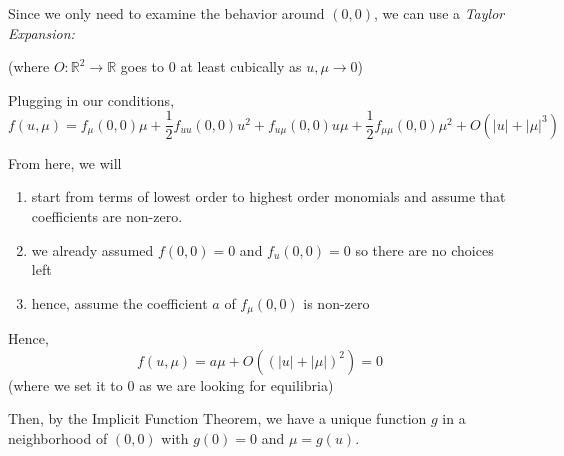 \documentclass[12pt]{report}
\newcommand{\R}{\mathbb{R}}
\newcommand{\abs}[1]{\left\vert #1 \right\vert}
\begin{document}
Since we only need to examine the behavior around $(0, 0)$, we can use a \emph{Taylor Expansion:}

(where $O: \R^2 \to \R$ goes to $0$ at least cubically as $u, \mu \to 0$)

Plugging in our conditions,
\[f(u, \mu) = f_{\mu}(0, 0) \mu + \frac{1}{2}f_{uu}(0,0)u^2 + f_{u\mu}(0, 0)u\mu + \frac{1}{2}f_{\mu\mu}(0, 0)\mu^2 + O({\abs{u}+ \abs{\mu}}^3)\]

From here, we will
\begin{enumerate}
    \item start from terms of lowest order to highest order monomials and assume that coefficients are non-zero.
    \item we already assumed $f(0, 0) = 0$ and $f_u(0, 0) = 0$ so there are no choices left
    \item hence, assume the coefficient $a$ of $f_{\mu}(0, 0)$ is non-zero
\end{enumerate}

Hence,
\[f(u, \mu) = a\mu + O((\abs{u} + \abs{\mu})^2) = 0\]
(where we set it to $0$ as we are looking for equilibria)

Then, by the Implicit Function Theorem, we have a unique function $g$ in a neighborhood of $(0, 0)$ with $g(0) = 0$ and $\mu = g(u)$.
\end{document}
